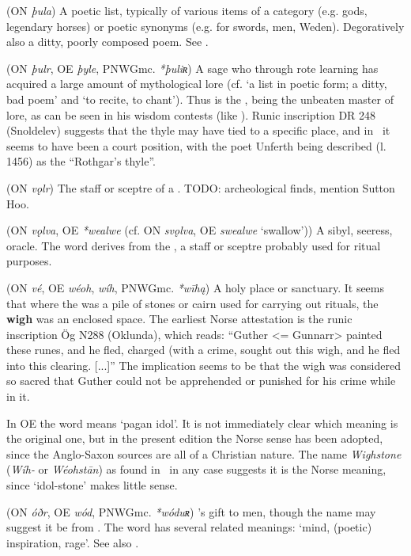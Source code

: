 \begin{itemize}
 (ON \emph{þula})
  A poetic list, typically of various items of a category (e.g. gods, legendary horses) or poetic synonyms (e.g. for swords, men, Weden). Degoratively also a ditty, poorly composed poem. See .

 (ON \emph{þulr}, OE \emph{þyle}, PNWGmc. \emph{*þuliʀ})
  A sage who through rote learning has acquired a large amount of mythological lore (cf.  ‘a list in poetic form; a ditty, bad poem’ and  ‘to recite, to chant’).  Thus  is the , being the unbeaten master of lore, as can be seen in his wisdom contests (like \Vafthrudnismal).  Runic inscription DR 248 (Snoldelev) suggests that the thyle may have tied to a specific place, and in \Beowulf\ it seems to have been a court position, with the poet Unferth being described (l. 1456) as the “Rothgar’s thyle”.

 (ON \emph{vǫlr})
  The staff or sceptre of a .  TODO: archeological finds, mention Sutton Hoo.

 (ON \emph{vǫlva}, OE \emph{*wealwe} (cf. ON \emph{svǫlva}, OE \emph{swealwe} ‘swallow’))
  A sibyl, seeress, oracle.  The word derives from the , a staff or sceptre probably used for ritual purposes.

 (ON \emph{vé}, OE \emph{wéoh}, \emph{wíh}, PNWGmc. \emph{*wīhą})
  A holy place or sanctuary. It seems that where the  was a pile of stones or cairn used for carrying out rituals, the \textbf{wigh} was an enclosed space. The earliest Norse attestation is the runic inscription Ög N288 (Oklunda), which reads: “Guther <= Gunnarr> painted these runes, and he fled, charged (with a crime, sought out this wigh, and he fled into this clearing. [...]” The implication seems to be that the wigh was considered so sacred that Guther could not be apprehended or punished for his crime while in it.

  In OE the word means ‘pagan idol’. It is not immediately clear which meaning is the original one, but in the present edition the Norse sense has been adopted, since the Anglo-Saxon sources are all of a Christian nature.  The name \emph{Wighstone} (\emph{Wíh-} or \emph{Wéohstān}) as found in \Beowulf\ in any case suggests it is the Norse meaning, since ‘idol-stone’ makes little sense.

 (ON \emph{óðr}, OE \emph{wód}, PNWGmc. \emph{*wóduʀ})
  ’s gift to men, though the name may suggest it be from . The word has several related meanings: ‘mind, (poetic) inspiration, rage’. See also .


\end{itemize}
